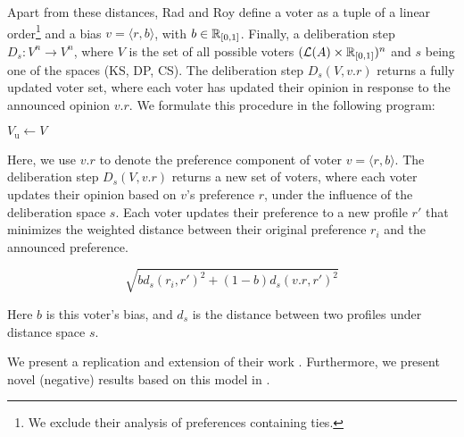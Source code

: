Apart from these distances, Rad and Roy define a voter as a tuple of a linear
order\footnote{We exclude their analysis of preferences containing ties.} and a
bias \(v = \langle r, b \rangle\), with \( b \in \mathbb{R}_{[0,1]}\). Finally, a
deliberation step \(D_{s} : V^n \to V^n\), where $V$ is the set of all possible
voters $ (\mathcal{L}(A) \times \mathbb{R}_{[0,1]})^n$ and $s$ being one of
the spaces (KS, DP, CS). The deliberation step $D_s(V, v.r)$ returns a fully
updated voter set, where each voter has updated their opinion in response to
the announced opinion $v.r$. We formulate this procedure in the following
program:

\IncMargin{1em}
\begin{algorithm}[H]

	\BlankLine

	$V_{\text{u}} \gets V$ \\

\end{algorithm}
\DecMargin{1em}


Here, we use $v.r$ to denote the preference component of voter $v = \langle r, b \rangle$.
The deliberation step $D_s(V, v.r)$ returns a new set of voters, where each voter updates
their opinion based on $v$'s preference $r$, under the influence of the deliberation
space $s$. Each voter updates their preference to a new profile $r'$ that minimizes the weighted distance between their original preference $r_i$ and the announced preference.

\begin{equation}
	\sqrt{
		b d_s(r_i, r')^2 + (1-b)d_s(v.r, r')^2
	}
	\label{eq:deliberation_step_formula}
\end{equation}

Here $b$ is this voter's bias, and $d_s$ is the distance between two profiles
under distance space $s$.

We present a replication and extension of their work .
Furthermore, we present novel (negative) results based on this model in
.

